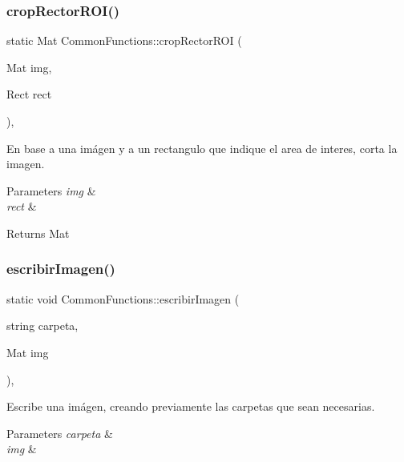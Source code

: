 \subsubsection{\texorpdfstring{crop\+Rector\+R\+O\+I()}{cropRectorROI()}}
{\footnotesize\ttfamily static Mat Common\+Functions\+::crop\+Rector\+R\+OI (\begin{DoxyParamCaption}\item[{Mat}]{img,  }\item[{Rect}]{rect }\end{DoxyParamCaption})\hspace{0.3cm}{\ttfamily [inline]}, {\ttfamily [static]}}



En base a una imágen y a un rectangulo que indique el area de interes, corta la imagen. 


\begin{DoxyParams}{Parameters}
{\em img} & \\
\hline
{\em rect} & \\
\hline
\end{DoxyParams}
\begin{DoxyReturn}{Returns}
Mat 
\end{DoxyReturn}
\mbox{\label{classCommonFunctions_a1cbb74aeab1ac5dc96ba4871d0f07792}} 
\subsubsection{\texorpdfstring{escribir\+Imagen()}{escribirImagen()}}
{\footnotesize\ttfamily static void Common\+Functions\+::escribir\+Imagen (\begin{DoxyParamCaption}\item[{string}]{carpeta,  }\item[{Mat}]{img }\end{DoxyParamCaption})\hspace{0.3cm}{\ttfamily [inline]}, {\ttfamily [static]}}



Escribe una imágen, creando previamente las carpetas que sean necesarias. 


\begin{DoxyParams}{Parameters}
{\em carpeta} & \\
\hline
{\em img} & \\
\hline
\end{DoxyParams}
\mbox{\label{classCommonFunctions_a188e7c8fcb797856482ecfd4010c62a9}} 
